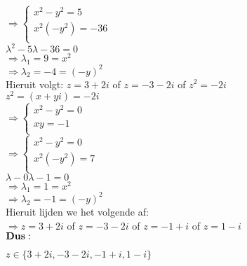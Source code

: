 \documentclass[a4paper]{article}
\begin{document}
    $\Rightarrow\left\{
	\begin{array}{l}
		x^2 - y^2 = 5\\
		x^2 \left(-y^2\right) = -36\\
	\end{array}
    \right .$\\

$\lambda^2 - 5\lambda - 36 = 0$\\

$\Rightarrow\lambda_1 = 9 = x^2$\\

$\Rightarrow\lambda_2 = -4 = \left(-y\right)^2$\\

Hieruit volgt: $z = 3 + 2i$ of $z = -3 - 2i$ of $z^2 = -2i$\\

$z^2 = \left(x + yi \right) = -2i$\\

    $\Rightarrow\left\{
	\begin{array}{l}
		x^2 - y^2 = 0\\
		xy = -1\\
	\end{array}
    \right .$\\

    $\Rightarrow\left\{
	\begin{array}{l}
		x^2 - y^2 = 0\\
		x^2 \left(-y^2\right) = 7\\
	\end{array}
    \right .$\\

    
$\lambda - 0\lambda - 1 = 0$\\

$\Rightarrow\lambda_1 = 1 = x^2$\\

$\Rightarrow\lambda_2 = -1 = \left(-y\right)^2$\\

Hieruit lijden we het volgende af: \\
$\Rightarrow z = 3 + 2i$ of $z = -3 - 2i$ of $z = -1 + i$ of $z = 1 - i$\\

$\bold {Dus:}$

$z \in \{3 + 2i, -3 - 2i, -1 + i, 1 - i\}$
    



\begin{thebibliography}{999}
\end{thebibliography}
\end{document}
